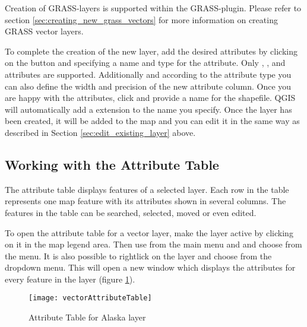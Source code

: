 Creation of GRASS-layers is supported within the GRASS-plugin. Please refer to section
\ref{sec:creating_new_grass_vectors} for more information on creating GRASS vector 
layers.

To complete the creation of the new layer, add the desired attributes by
clicking on the  button and specifying a name and type for the
attribute. Only , , and
 attributes are supported. Additionally and
according to the attribute type you can also define the width and precision
of the new attribute column. Once you are happy with the attributes, click
 and provide a name for the shapefile. QGIS will automatically add
a  extension to the name you specify. Once
the layer has been created, it will be added to the map and you can edit it in
the same way as described in Section \ref{sec:edit_existing_layer} above. 

\subsection{Working with the Attribute Table}\label{sec:attribute table}

The attribute table displays features of a selected layer. Each row in the table 
represents one map feature with its attributes shown in several columns. The 
features in the table can be searched, selected, moved or even edited.

To open the attribute table for a vector layer, make the layer active by clicking 
on it in the map legend area. Then use  from the main menu 
and and choose  
from the menu. It is also possible to rightlick on the layer and 
choose  from the 
dropdown menu. This will open a new window which displays the attributes for 
every feature in the layer (figure \ref{fig:attributetable}).

\begin{figure}[ht]
   \begin{center}
   \caption{Attribute Table for Alaska layer \nixcaption}\label{fig:attributetable}\smallskip
   \texttt{[image: vectorAttributeTable]}
\end{center} 
\end{figure}


